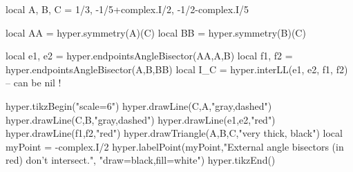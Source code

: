 \documentclass[tikz]{standalone}
\begin{document}
\begin{luacode*}
local A, B, C = 1/3, -1/5+complex.I/2, -1/2-complex.I/5

local AA = hyper.symmetry(A)(C)
local BB = hyper.symmetry(B)(C)

local e1, e2 = hyper.endpointsAngleBisector(AA,A,B)
local f1, f2 = hyper.endpointsAngleBisector(A,B,BB)
local I_C = hyper.interLL(e1, e2, f1, f2) -- can be nil !

hyper.tikzBegin("scale=6")
hyper.drawLine(C,A,"gray,dashed")
hyper.drawLine(C,B,"gray,dashed")
hyper.drawLine(e1,e2,"red")
hyper.drawLine(f1,f2,"red")
hyper.drawTriangle(A,B,C,"very thick, black")
local myPoint = -complex.I/2
hyper.labelPoint(myPoint,"External angle bisectors (in red) don't intersect.", "draw=black,fill=white")
hyper.tikzEnd()
\end{luacode*}
\end{document}
